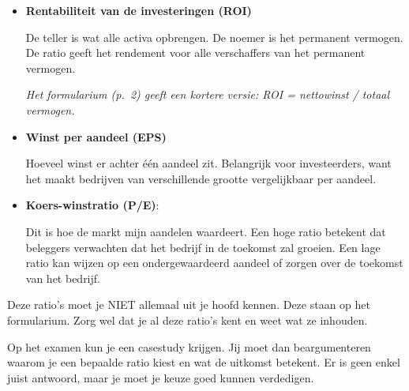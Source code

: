 \documentclass[a4paper,11pt]{article}
\begin{document}
\begin{description}
\begin{itemize}
              \item \textbf{Rentabiliteit van de investeringen (ROI)}

                    {De teller is wat alle activa opbrengen. De noemer is het permanent vermogen.
                        De ratio geeft het rendement voor alle verschaffers van het permanent vermogen.}

                    \textit{Het formularium (p.~2) geeft een kortere versie: ROI = nettowinst / totaal vermogen.}

              \item \textbf{Winst per aandeel (EPS)}

                    {Hoeveel winst er achter één aandeel zit. Belangrijk voor investeerders,
                        want het maakt bedrijven van verschillende grootte vergelijkbaar per aandeel.}

              \item \textbf{Koers-winstratio (P/E)}:

                    {Dit is hoe de markt mijn aandelen waardeert.
                        Een hoge ratio betekent dat beleggers verwachten dat het bedrijf in de toekomst zal groeien.
                        Een lage ratio kan wijzen op een ondergewaardeerd aandeel of zorgen over de toekomst van het bedrijf.}
          \end{itemize}

          \begin{examenbox}
              Deze ratio's moet je NIET allemaal uit je hoofd kennen.
              Deze staan op het formularium. Zorg wel dat je al deze ratio's kent
              en weet wat ze inhouden.
          \end{examenbox}

          \begin{examenbox}
              Op het examen kun je een casestudy krijgen.
              Jij moet dan beargumenteren waarom je een bepaalde ratio kiest en wat de uitkomst betekent.
              Er is geen enkel juist antwoord, maar je moet je keuze goed kunnen verdedigen.
          \end{examenbox}

\end{description}
\end{document}
